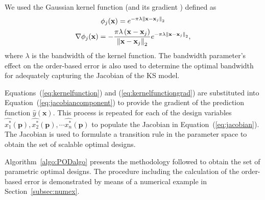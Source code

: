 We used the Gaussian kernel function (and its gradient ) defined as
\begin{gather}
	\label{eq:kernelfunction}
	\phi_j(\mathbf{x}) = e^{-\pi\lambda \left\lVert\mathbf{x}-\mathbf{x}_j\right\rVert_2}\\
	\label{eq:kernelfunctiongrad}
	\nabla\phi_j(\mathbf{x}) = -\dfrac{\pi\lambda\left(\mathbf{x} - \mathbf{x}_j\right)}{\left\lVert\mathbf{x} - \mathbf{x}_j\right\rVert_2}e^{-\pi\lambda \left\lVert\mathbf{x}-\mathbf{x}_j\right\rVert_2},
\end{gather}
where $\lambda$ is the bandwidth of the kernel function. The bandwidth parameter's effect on the order-based error is also used to determine the optimal bandwidth for adequately capturing the Jacobian of the \ac{KS} model.

Equations~(\ref{eq:kernelfunction}) and (\ref{eq:kernelfunctiongrad}) are substituted into Equation~(\ref{eq:jacobiancomponent}) to provide the gradient of the prediction function $\hat{y}(\mathbf{x})$. This process is repeated for each of the design variables $\hat{x_1^*}(\mathbf{p}), \hat{x_2^*}(\mathbf{p}), \cdots \hat{x_n^*}(\mathbf{p})$ to populate the Jacobian in Equation~(\ref{eq:jacobian}). The Jacobian is used to formulate a transition rule in the parameter space to obtain the set of scalable optimal designs.

Algorithm~\ref{algo:PODalgo} presents the methodology followed to obtain the set of parametric optimal designs. The procedure including the calculation of the order-based error is demonstrated by means of a numerical example in Section~\ref{subsec:numex}.

